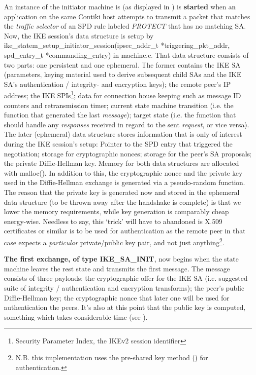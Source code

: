 \documentclass[final,a4paper,twoside,11pt,onecolumn]{report}
\begin{document}
An instance of the initiator machine is (as displayed in ) is \textbf{started} when an application on the same Contiki host attempts to transmit a packet that matches the \emph{traffic selector} of an SPD rule labeled \emph{PROTECT} that has no matching SA. Now, the IKE session's data structure is setup by ike\_statem\_setup\_initiator\_session(ipsec\_addr\_t *triggering\_pkt\_addr, spd\_entry\_t *commanding\_entry) in machine.c. That data structure consists of two parts: one persistent and one ephemeral. The former contains the IKE SA (parameters, keying material used to derive subsequent child SAs and the IKE SA's authentication / integrity- and encryption keys); the remote peer's IP address; the IKE SPIs\footnote{Security Parameter Index, the IKEv2 session identifier}; data for connection house keeping such as message ID counters and retransmission timer; current state machine transition (i.e. the function that generated the last \emph{message}); target state (i.e. the function that should handle any \emph{responses} received in regard to the sent \emph{request}, or vice versa). The later (ephemeral) data structure stores information that is only of interest during the IKE session's setup: Pointer to the SPD entry that triggered the negotiation; storage for cryptographic nonces; storage for the peer's SA proposals; the private Diffie-Hellman key. Memory for both data structures are allocated with malloc(). In addition to this, the cryptographic nonce and the private key used in the Diffie-Hellman exchange is generated via a pseudo-random function. The reason that the private key is generated now and stored in the ephemeral data structure (to be thrown away after the handshake is complete) is that we lower the memory requirements, while key generation is comparably cheap energy-wise. Needless to say, this `trick' will have to abandoned is X.509 certificates or similar is to be used for authentication as the remote peer in that case expects a \emph{particular} private/public key pair, and not just anything\footnote{N.B. this implementation uses the pre-shared key method (\citep[p.49]{rfc5996}) for authentication.}.

\textbf{The first exchange, of type IKE\_SA\_INIT}, now begins when the state machine leaves the rest state and transmits the first message. The message consists of three payloads: the cryptographic offer for the IKE SA (i.e. suggested suite of integrity / authentication and encryption transforms); the peer's public Diffie-Hellman key; the cryptographic nonce that later one will be used for authentication the peers. It's also at this point that the public key is computed, something which takes considerable time (see ).
\end{document}
